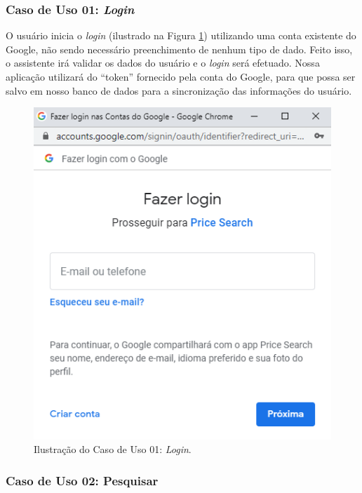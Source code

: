 \subsubsection{Caso de Uso 01: \textit{Login}}

O usuário inicia o \textit{login} (ilustrado na Figura  \ref{fig:login}) utilizando uma conta existente do Google, não sendo necessário preenchimento de nenhum tipo de dado. Feito isso, o assistente irá validar os dados do usuário e o \textit{login} será efetuado. Nossa aplicação utilizará do ``token'' fornecido pela conta do Google, para que possa ser salvo em nosso banco de dados para a sincronização das informações do usuário.

\begin{figure}[H]
\centering
\includegraphics[width=\linewidth]{figuras/tela-login.png}
\caption{Ilustração do Caso de Uso 01: \textit{Login}.}
\label{fig:login}
\end{figure}

\subsubsection{Caso de Uso 02: Pesquisar}

